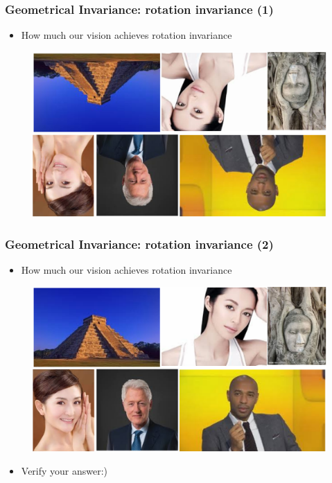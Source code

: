 \begin{frame}
\frametitle {Geometrical Invariance: rotation invariance (1)}
\begin{itemize}
	\item {How much our vision achieves rotation invariance}
\end{itemize}
\begin{figure}
	{\includegraphics[width=0.75\linewidth]{./figs/invariance_rotate1.pdf}}
\end{figure}
\end{frame}

\begin{frame}
\frametitle {Geometrical Invariance: rotation invariance (2)}
\begin{itemize}
	\item {How much our vision achieves rotation invariance}
\end{itemize}
\begin{figure}
	{\includegraphics[width=0.75\linewidth]{./figs/invariance_rotate2.pdf}}
\end{figure}
\begin{itemize}
	\item {Verify your answer:)}
\end{itemize}
\end{frame}

